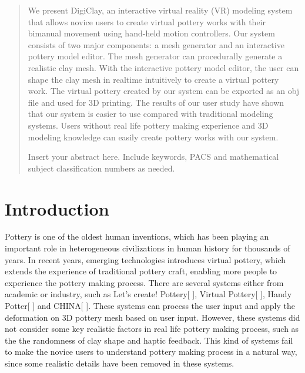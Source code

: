 
\date{Received: date / Accepted: date}


\maketitle

\begin{abstract}
We present DigiClay, an interactive virtual reality (VR) modeling system that allows novice users to create virtual pottery works with their bimanual movement using hand-held motion controllers.
Our system consists of two major components: a mesh generator and an interactive pottery model editor.
The mesh generator can procedurally generate a realistic clay mesh. With the interactive pottery model editor, the user can shape the clay mesh in realtime intuitively to create a virtual pottery work.
The virtual pottery created by our system can be exported as an obj file and used for 3D printing.
The results of our user study have shown that our system is easier to use compared with traditional modeling systems. Users without real life pottery making experience and 3D modeling knowledge can easily create pottery works with our system.


Insert your abstract here. Include keywords, PACS and mathematical
subject classification numbers as needed.
\end{abstract}

\section{Introduction}
\label{intro}

Pottery is one of the oldest human inventions, which has been playing an important role in heterogeneous civilizations in human history for thousands of years.
In recent years, emerging technologies introduces virtual pottery, which extends the experience of traditional pottery craft, enabling more people to experience the pottery making process.
There are several systems either from academic or industry, such as Let’s create! Pottery[ ], Virtual Pottery[ ], Handy Potter[ ] and CHINA[ ].
These systems can process the user input and apply the deformation on 3D pottery mesh based on user input.
However, these systems did not consider some key realistic factors in real life pottery making process, such as the the randomness of clay shape and haptic feedback.
This kind of systems fail to make the novice users to understand pottery making process in a natural way, since some realistic details have been removed in these systems.

